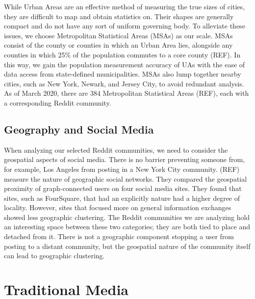 \documentclass[12pt,oneside, letterpaper]{book}
\begin{document}
\par While Urban Areas are an effective method of measuring the true sizes of cities, they are difficult to map and obtain statistics on. Their shapes are generally compact and do not have any sort of uniform governing body. To alleviate these issues, we choose Metropolitan Statistical Areas (MSAs) as our scale. MSAs consist of the county or counties in which an Urban Area lies, alongside any counties in which 25\% of the population commutes to a core county (REF). In this way, we gain the population measurement accuracy of UAs with the ease of data access from state-defined municipalities. MSAs also lump together nearby cities, such as New York, Newark, and Jersey City, to avoid redundant analysis. As of March 2020, there are 384 Metropolitan Statistical Areas (REF), each with a corresponding Reddit community.

\subsection{Geography and Social Media}

\par When analyzing our selected Reddit communities, we need to consider the geospatial aspects of social media. There is no barrier preventing someone from, for example, Los Angeles from posting in a New York City community. (REF) measure the nature of geographic social networks. They compared the geospatial proximity of graph-connected users on four social media sites. They found that sites, such as FourSquare, that had an explicitly nature had a higher degree of locality. However, sites that focused more on general information exchanges showed less geographic clustering. The Reddit communities we are analyzing hold an interesting space between these two categories; they are both tied to place and detached from it. There is not a geographic component stopping a user from posting to a distant community, but the geospatial nature of the community itself can lead to geographic clustering.

\section{Traditional Media}

\end{document}
